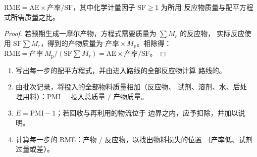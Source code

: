 \begin{proposition}\label{prop:b3:green-industrial:rme}
$\mathrm{RME} = \mathrm{AE} \times \text{产率}/\mathrm{SF}$，其中化学计量因子 $\mathrm{SF} \ge 1$ 为所用
反应物质量与配平方程式所需质量之比。
\end{proposition}

\begin{proof}
若预期生成一摩尔产物，方程式需要质量为 $\sum M_r$ 的反应物，
实际反应使用 $\mathrm{SF}\sum M_r$，得到的产物质量为 $\text{产率} \times M_{\mathrm p}$。相除得：
$\mathrm{RME} = \text{产率}\,M_{\mathrm p}/(\mathrm{SF}\sum M_r) = \mathrm{AE} \times \text{产率}/\mathrm{SF}$。
\end{proof}

\begin{method}[计算路线的各项指标]\label{met:b3:green-industrial:metrics}
\begin{enumerate}
  \item 写出每一步的配平方程式，并由进入路线的全部反应物计算
        路线的。
  \item 由批次记录，将投入的全部物料质量相加（反应物、
        试剂、溶剂、水、后处理用料）：PMI = 投入总质量 / 产物质量。
  \item $E = \mathrm{PMI} - 1$；若回收与再利用的物流位于
        边界之内，应予扣除，并加以说明。
  \item 计算每一步的 RME：产物 / 反应物，以找出物料损失的位置
        （产率低、试剂过量或差）。
\end{enumerate}
\end{method}

